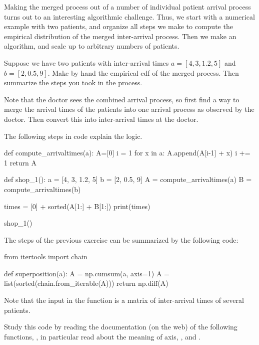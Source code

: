 Making the merged process out of a number of individual patient arrival process turns out to an interesting algorithmic challenge.
Thus, we start with a numerical example with two patients, and organize all steps we make to compute the empirical distribution of the merged inter-arrival process.
Then we make an algorithm, and scale up to arbitrary numbers of patients.

\begin{exercise}
  Suppose we have two patients with inter-arrival times $a=[4, 3, 1.2, 5]$ and $b=[2, 0.5, 9]$.
  Make by hand the empirical cdf of the merged process.
  Then summarize the steps you took in the process.

\begin{hint}
Note that the doctor sees the combined arrival process, so first find a way to merge the arrival times of the patients into one arrival process as observed by the doctor. Then convert this into inter-arrival times at the doctor.
\end{hint}
\begin{solution}
    The following steps in code explain the logic.
    \begin{pyverbatim}
def compute_arrivaltimes(a):
    A=[0]
    i = 1
    for x in a:
        A.append(A[i-1] + x)
        i += 1
    return A

def shop_1():
    a = [4, 3, 1.2, 5]
    b = [2, 0.5, 9]
    A = compute_arrivaltimes(a)
    B = compute_arrivaltimes(b)

    times = [0] + sorted(A[1:] + B[1:])
    print(times)

shop_1()
    \end{pyverbatim}
  \end{solution}
\end{exercise}


\begin{exercise}
The steps of the previous exercise can be summarized by the following code:
\begin{pyverbatim}
from itertools import chain

def superposition(a):
    A = np.cumsum(a, axis=1)
    A = list(sorted(chain.from_iterable(A)))
    return np.diff(A)
\end{pyverbatim}
Note that the input  in the function  is a matrix of inter-arrival times of several patients.

Study this code by reading the documentation (on the web) of the following functions, , in particular read about the meaning of axis, , and .

\end{exercise}


